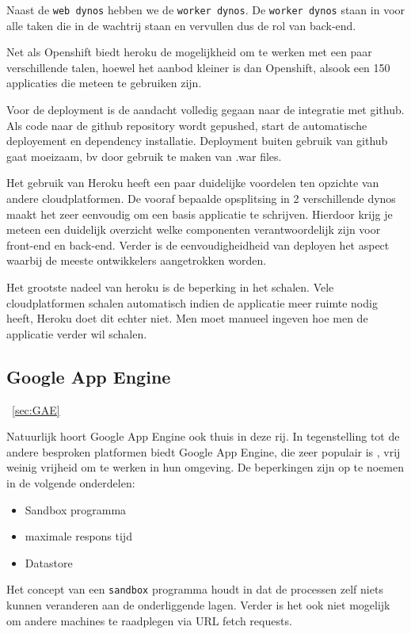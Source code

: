 Naast de \texttt{web dynos} hebben we de \texttt{worker dynos}.
De \texttt{worker dynos} staan in voor alle taken die in de wachtrij staan en vervullen dus de rol van back-end.

Net als Openshift biedt heroku de mogelijkheid om te werken met een paar verschillende talen, hoewel het aanbod kleiner is dan Openshift, alsook een 150 applicaties die meteen te gebruiken zijn.

Voor de deployment is de aandacht volledig gegaan naar de integratie met github.  Als code naar de github repository wordt gepushed, start de automatische deployement en dependency installatie.  Deployment buiten gebruik van github gaat moeizaam, bv door gebruik te maken van .war files.

Het gebruik van Heroku heeft een paar duidelijke voordelen ten opzichte van andere cloudplatformen.
De vooraf bepaalde opsplitsing in 2 verschillende dynos maakt het zeer eenvoudig om een basis applicatie te schrijven.  Hierdoor krijg je meteen een duidelijk overzicht welke componenten verantwoordelijk zijn voor front-end en back-end.  Verder is de eenvoudigheidheid van deployen het aspect waarbij de meeste ontwikkelers aangetrokken worden.

Het grootste nadeel van heroku is de beperking in het schalen.  Vele cloudplatformen schalen automatisch indien de applicatie meer ruimte nodig heeft, Heroku doet dit echter niet.  Men moet manueel ingeven hoe men de applicatie verder wil schalen.


\subsection{Google App Engine}~\ref{sec:GAE}

Natuurlijk hoort Google App Engine ook thuis in deze rij.
In tegenstelling tot de andere besproken platformen biedt Google App Engine, die zeer populair is , vrij weinig vrijheid om te werken in hun omgeving.
De beperkingen zijn op te noemen in de volgende onderdelen:
\begin{itemize}
	\item Sandbox programma
	\item maximale respons tijd
	\item Datastore
\end{itemize}
Het concept van een \texttt{sandbox} programma houdt in dat de processen zelf niets kunnen veranderen aan de onderliggende lagen.
Verder is het ook niet mogelijk om andere machines te raadplegen via URL fetch requests.

